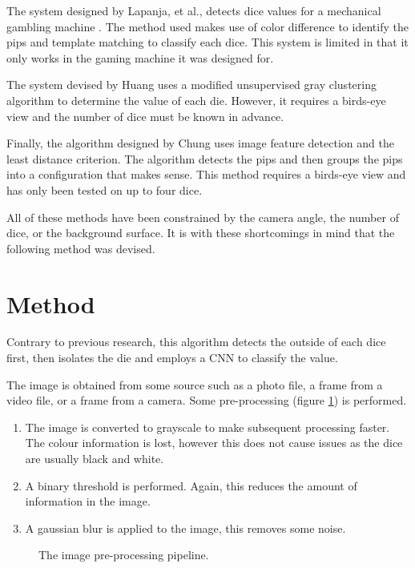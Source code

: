 \documentclass[conference]{IEEEtran}
\begin{document}
The system designed by Lapanja, et al., detects dice values for a mechanical gambling machine \cite{Lapanjaa}.
The method used makes use of color difference to identify the pips and template matching to classify each dice.
This system is limited in that it only works in the gaming machine it was designed for.

The system devised by Huang \cite{Huang2008} uses a modified unsupervised gray clustering algorithm to determine the value of each die.
However, it requires a birds-eye view and the number of dice must be known in advance.

Finally, the algorithm designed by Chung \cite{Chung2009} uses image feature detection and the least distance criterion.
The algorithm detects the pips and then groups the pips into a configuration that makes sense.
This method requires a birds-eye view and has only been tested on up to four dice.

All of these methods have been constrained by the camera angle, the number of dice, or the background surface.
It is with these shortcomings in mind that the following method was devised.

\section{Method}

Contrary to previous research, this algorithm detects the outside of each dice first, then isolates the die and employs a CNN to classify the value.

The image is obtained from some source such as a photo file, a frame from a video file, or a frame from a camera.
Some pre-processing (figure \ref{fig:pre-processing}) is performed.
\begin{enumerate}
	\item The image is converted to grayscale to make subsequent processing faster. The colour information is lost, however this does not cause issues as the dice are usually black and white.
	\item A binary threshold is performed. Again, this reduces the amount of information in the image.
	\item A gaussian blur is applied to the image, this removes some noise.
\end{enumerate}
\begin{figure}
	\centering
	\caption{The image pre-processing pipeline.}
	\label{fig:pre-processing}
\end{figure}
\end{document}
